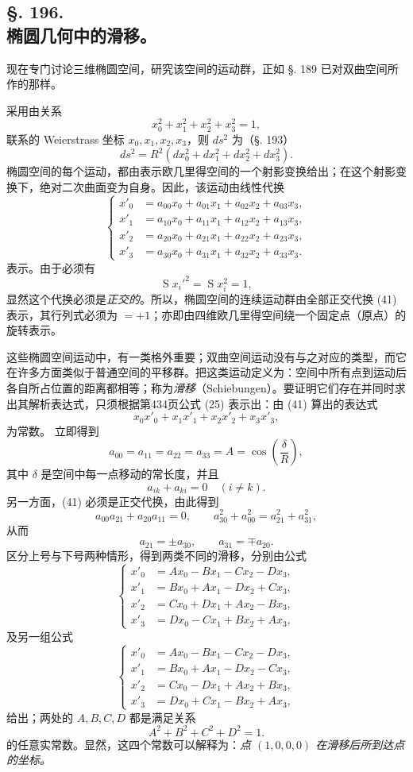 \subsection*{§. 196.\\ 椭圆几何中的滑移。}

现在专门讨论三维椭圆空间，研究该空间的运动群，正如 §. 189 已对双曲空间所作的那样。

采用由关系
\[
\tag{40}
 x_0^2+x_1^2+x_2^2+x_3^2=1,
\]
联系的 Weierstrass 坐标 $x_0,x_1,x_2,x_3$，则 $ds^2$ 为（§. 193）
\[
\tag{40*}
 ds^2=R^2(dx_0^2+dx_1^2+dx_2^2+dx_3^2).
\]
椭圆空间的每个运动，都由表示欧几里得空间的一个射影变换给出；在这个射影变换下，绝对二次曲面变为自身。因此，该运动由线性代换
\[
\tag{41}
\left\{
\begin{aligned}
 x'_0&=a_{00}x_0+a_{01}x_1+a_{02}x_2+a_{03}x_3,\\
 x'_1&=a_{10}x_0+a_{11}x_1+a_{12}x_2+a_{13}x_3,\\
 x'_2&=a_{20}x_0+a_{21}x_1+a_{22}x_2+a_{23}x_3,\\
 x'_3&=a_{30}x_0+a_{31}x_1+a_{32}x_2+a_{33}x_3.
\end{aligned}\right.
\]
表示。由于必须有
\[
 \mathop{\mathrm{S}}x_i'^2=\mathop{\mathrm{S}}x_i^2=1,
\]
显然这个代换必须是\emph{正交的}。所以，椭圆空间的连续运动群由全部正交代换 (41) 表示，其行列式必须为 $=+1$；亦即由四维欧几里得空间绕一个固定点（原点）的旋转表示。

这些椭圆空间运动中，有一类格外重要；双曲空间运动没有与之对应的类型，而它在许多方面类似于普通空间的平移群。把这类运动定义为：空间中所有点到运动后各自所占位置的距离都相等；称为\emph{滑移}（Schiebungen）。要证明它们存在并同时求出其解析表达式，只须根据第434页公式 (25) 表示出：由 (41) 算出的表达式
\[
 x_0x'_0+x_1x'_1+x_2x'_2+x_3x'_3,
\]
为常数。
立即得到
\[
 a_{00}=a_{11}=a_{22}=a_{33}=A=\cos\left(\frac\delta R\right),
\]
其中 $\delta$ 是空间中每一点移动的常长度，并且
\[
 a_{ik}+a_{ki}=0\quad (i\ne k).
\]
另一方面，(41) 必须是正交代换，由此得到
\[
 a_{00}a_{21}+a_{20}a_{11}=0,
 \qquad a_{30}^2+a_{00}^2=a_{21}^2+a_{31}^2,
\]
从而
\[
 a_{21}=\pm a_{30},\qquad a_{31}=\mp a_{20}.
\]
区分上号与下号两种情形，得到两类不同的滑移，分别由公式
\[
\tag{III}
\left\{
\begin{aligned}
 x'_0&=Ax_0-Bx_1-Cx_2-Dx_3,\\
 x'_1&=Bx_0+Ax_1-Dx_2+Cx_3,\\
 x'_2&=Cx_0+Dx_1+Ax_2-Bx_3,\\
 x'_3&=Dx_0-Cx_1+Bx_2+Ax_3,
\end{aligned}\right.
\]
及另一组公式
\[
\tag{III*}
\left\{
\begin{aligned}
 x'_0&=Ax_0-Bx_1-Cx_2-Dx_3,\\
 x'_1&=Bx_0+Ax_1-Dx_2-Cx_3,\\
 x'_2&=Cx_0-Dx_1+Ax_2+Bx_3,\\
 x'_3&=Dx_0+Cx_1-Bx_2+Ax_3,
\end{aligned}\right.
\]
给出；两处的 $A,B,C,D$ 都是满足关系
\[
 A^2+B^2+C^2+D^2=1.
\]
的任意实常数。显然，这四个常数可以解释为：\emph{点 $(1,0,0,0)$ 在滑移后所到达点的坐标。}

